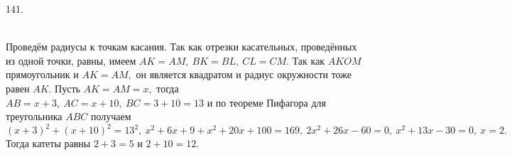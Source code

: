 141. \begin{figure}[ht!]
\end{figure}\\
Проведём радиусы к точкам касания. Так как отрезки касательных, проведённых из одной точки, равны, имеем $AK=AM,\ BK=BL,\ CL=CM.$ Так как $AKOM$ прямоугольник и $AK=AM,$ он является квадратом и радиус окружности тоже равен $AK.$ Пусть $AK=AM=x,$ тогда $AB=x+3,\ AC=x+10,\ BC=3+10=13$ и по теореме Пифагора для треугольника $ABC$ получаем $(x+3)^2+(x+10)^2=13^2,\ x^2+6x+9+x^2+20x+100=169,\ 2x^2+26x-60=0,\ x^2+13x-30=0,\ x=2.$ Тогда катеты равны $2+3=5$ и $2+10=12.$\newpage\noindent
